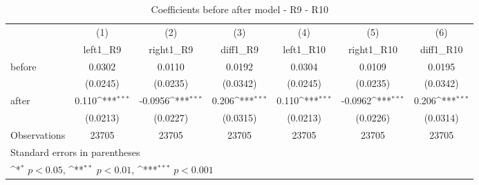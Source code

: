 \begin{table}[!ht]\centering \footnotesize
\def\sym#1{\ifmmode^{#1}\else\(^{#1}\)\fi}
\caption{Coefficients before after model - R9 - R10}
\begin{tabular}{l*{6}{c}}
\hline\hline
                    &\multicolumn{1}{c}{(1)}&\multicolumn{1}{c}{(2)}&\multicolumn{1}{c}{(3)}&\multicolumn{1}{c}{(4)}&\multicolumn{1}{c}{(5)}&\multicolumn{1}{c}{(6)}\\
                    &\multicolumn{1}{c}{left1\_R9}&\multicolumn{1}{c}{right1\_R9}&\multicolumn{1}{c}{diff1\_R9}&\multicolumn{1}{c}{left1\_R10}&\multicolumn{1}{c}{right1\_R10}&\multicolumn{1}{c}{diff1\_R10}\\
\hline
before              &      0.0302         &      0.0110         &      0.0192         &      0.0304         &      0.0109         &      0.0195         \\
                    &    (0.0245)         &    (0.0235)         &    (0.0342)         &    (0.0245)         &    (0.0235)         &    (0.0342)         \\
[1em]
after               &       0.110\sym{***}&     -0.0956\sym{***}&       0.206\sym{***}&       0.110\sym{***}&     -0.0962\sym{***}&       0.206\sym{***}\\
                    &    (0.0213)         &    (0.0227)         &    (0.0315)         &    (0.0213)         &    (0.0226)         &    (0.0314)         \\
\hline
Observations        &       23705         &       23705         &       23705         &       23705         &       23705         &       23705         \\
\hline\hline
\multicolumn{7}{l}{\footnotesize Standard errors in parentheses}\\
\multicolumn{7}{l}{\footnotesize \sym{*} \(p<0.05\), \sym{**} \(p<0.01\), \sym{***} \(p<0.001\)}\\
\end{tabular}
\end{table}
